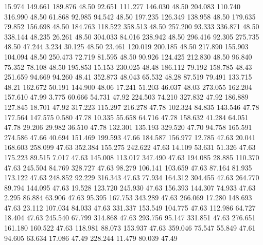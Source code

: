   15.974  149.661  189.876        48.50
  92.651  111.277  146.030        48.50
 204.083  110.740  316.990        48.50
  61.868   92.985   94.542        48.50
 197.235  126.349  138.958        48.50
 179.635   79.852  156.698        48.50
 184.763  118.522  358.513        48.50
 257.200   93.333  336.871        48.50
 338.144   48.235   26.261        48.50
 304.033   84.016  238.942        48.50
 296.416   92.305  275.735        48.50
  47.244    3.234   30.125        48.50
  23.461  120.019  200.185        48.50
 217.890  155.903  104.094        48.50
 250.473   72.719   81.595        48.50
  90.926  124.425  212.830        48.50
  96.840   75.352   78.108        48.50
 195.853   15.153  230.025        48.48
 186.112   79.192  158.785        48.43
 251.659   94.669   94.260        48.41
 352.873   48.043   65.532        48.28
  87.519   79.491  133.715        48.21
 162.672   50.191  144.900        48.06
  17.241   51.203   46.037        48.03
 273.055  162.204  157.610        47.99
   3.775   60.666   54.731        47.92
 224.503   74.210  327.832        47.92
 186.889  127.845   18.701        47.92
 317.223  115.297  216.278        47.78
 102.324   84.835  143.546        47.78
 177.564  147.575    0.580        47.78
  10.335   55.658   64.716        47.78
 158.632   41.284   64.051        47.78
  29.206   29.982   36.510        47.78
 132.301  135.193  329.520        47.70
  94.758  165.591  274.586        47.66
  40.694  151.469  199.593        47.66
 184.587  156.977   12.785        47.63
  20.041  168.603  258.099        47.63
 352.384  155.275  242.622        47.63
  14.109   53.631   51.326        47.63
 175.223   89.515    7.017        47.63
 145.008  113.017  347.490        47.63
 194.085   28.885  110.370        47.63
 245.504   84.769  328.727        47.63
  98.279  106.141  103.659        47.63
  87.164   81.935  173.122        47.63
 248.852   92.229  316.343        47.63
  77.934  164.312  304.455        47.63
 264.770   89.794  144.095        47.63
  19.528  123.720  245.930        47.63
 156.393  144.307   74.933        47.63
   2.295   86.884   63.906        47.63
  95.395  167.753  343.289        47.63
 266.069   17.280  148.693        47.63
  23.112  107.034   84.033        47.63
 331.337  153.549  104.775        47.63
 112.986   64.727   18.404        47.63
 245.540   67.799  314.868        47.63
 293.756   95.147  331.851        47.63
 276.651  161.180  160.522        47.63
 118.981   88.073  153.937        47.63
 359.046   75.547   55.849        47.61
  94.605   63.634   17.086        47.49
 228.244   11.479   80.039        47.49
